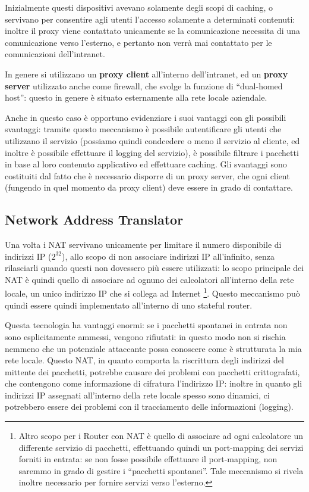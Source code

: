 Inizialmente questi dispositivi avevano solamente degli scopi di caching, o
servivano per consentire agli utenti l'accesso solamente a determinati 
contenuti: inoltre il proxy viene contattato unicamente se la comunicazione
necessita di una comunicazione verso l'esterno, e pertanto non verrà mai
contattato per le comunicazioni dell'intranet. 

In genere si utilizzano un \textbf{proxy client} all'interno dell'intranet, ed un
\textbf{proxy server} utilizzato anche come firewall, che svolge la funzione di
``dual-homed host'': questo in genere è situato esternamente alla rete locale
aziendale.

Anche in questo caso è opportuno evidenziare i suoi vantaggi con gli possibili
svantaggi: tramite questo meccanismo è possibile autentificare gli utenti che
utilizzano il servizio (possiamo quindi condcedere o meno il servizio al cliente,
ed inoltre è possibile effettuare il logging del servizio), è possibile 
filtrare i pacchetti in base al loro contenuto applicativo ed effettuare caching.
Gli svantaggi sono costituiti dal fatto che è necessario disporre di un 
proxy server, che ogni client (fungendo in quel momento da proxy client) deve
essere in grado di contattare. 

\subsection{Network Address Translator}
Una volta i NAT servivano unicamente per limitare il numero disponibile di 
indirizzi IP ($2^{32}$), allo scopo di non associare indirizzi IP all'infinito, 
senza rilasciarli quando questi non dovessero più essere utilizzati: lo scopo 
principale dei NAT è quindi quello di associare ad ognuno dei calcolatori 
all'interno della rete locale, un unico indirizzo IP che si collega ad Internet
\footnote{Altro scopo per i Router con NAT è quello di associare ad ogni
calcolatore un differente servizio di pacchetti, effettuando quindi un port-mapping
dei servizi forniti in entrata: se non fosse possibile effettuare il port-mapping,
non saremmo in grado di gestire i ``pacchetti spontanei''. Tale meccanismo si
rivela inoltre necessario per fornire servizi verso l'esterno.}. 
Questo  meccanismo può quindi essere quindi implementato all'interno di uno 
stateful router. 

Questa tecnologia ha vantaggi enormi: se i pacchetti spontanei in entrata non
sono esplicitamente ammessi, vengono rifiutati: in questo modo non si rischia
nemmeno che un potenziale attaccante possa conoscere come è strutturata la mia
rete locale. Questo NAT, in quanto comporta la riscrittura degli indirizzi del
mittente dei pacchetti, potrebbe causare dei problemi con pacchetti crittografati,
che contengono come informazione di cifratura l'indirizzo IP: inoltre in quanto
gli indirizzi IP assegnati all'interno della rete locale spesso sono dinamici,
ci potrebbero essere dei problemi con il tracciamento delle informazioni (logging).

